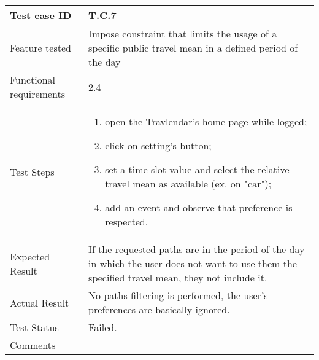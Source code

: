 \begin{table}[H]
	\begin{center}
		\begin{tabular}{ | p{} | p{} | }
		\hline
		Test case ID & T.C.7\\
		\hline
		Feature tested & Impose constraint that limits the usage of a specific public travel mean in a defined period of the day\\
		\hline
		Functional requirements & 2.4  \\
		\hline
		Test Steps & 
			\begin{enumerate}
				\item open the Travlendar's home page while logged;
				\item click on setting's button;
				\item set a time slot value and select the relative travel mean as available (ex. on "car");
				\item add an event and observe that preference is respected.
			\end{enumerate} \\
		\hline
		Expected Result & If the requested paths are in the period of the day in which the user does not want to use them the specified travel mean, they not include it.\\
		\hline
		Actual Result & No paths filtering is performed, the user's preferences are basically ignored.\\ 
		\hline
		Test Status & \color{Red}Failed.\\ 
		\hline
		Comments &\\ 
		\hline
		\end{tabular}
	\end{center}
\end{table}

